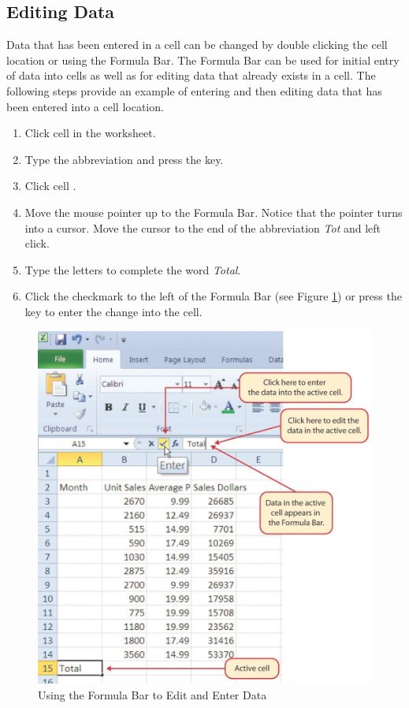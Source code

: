 \subsection{Editing Data}

Data that has been entered in a cell can be changed by double clicking the cell location or using the Formula Bar. The Formula Bar can be used for initial entry of data into cells as well as for editing data that already exists in a cell. The following steps provide an example of entering and then editing data that has been entered into a cell location.

\begin{enumerate}
	\item Click cell  in the  worksheet.
	\item Type the abbreviation  and press the  key.
	\item Click cell .
	\item Move the mouse pointer up to the Formula Bar. Notice that the pointer turns into a cursor. Move the cursor to the end of the abbreviation \textit{Tot} and left click.
	\item Type the letters  to complete the word \textit{Total}.
	\item Click the checkmark to the left of the Formula Bar (see Figure \ref{01:fig17}) or press the  key to enter the change into the cell.
\end{enumerate}

\begin{figure}[H]
	\centering
	\includegraphics[width=\maxwidth{.95\linewidth}]{gfx/ch01_fig17}
	\caption{Using the Formula Bar to Edit and Enter Data}
	\label{01:fig17}
\end{figure}

